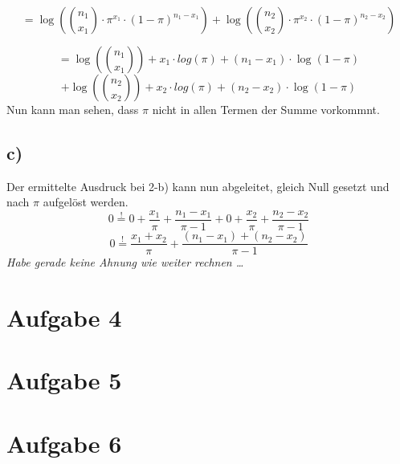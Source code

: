 \[ = \log\left({n_1 \choose x_1} \cdot \pi^{x_1} \cdot (1-\pi)^{n_1-x_1}\right)
   + \log\left({n_2 \choose x_2} \cdot \pi^{x_2} \cdot (1-\pi)^{n_2-x_2}\right)   \]

\[ = \log\left( {n_1 \choose x_1} \right) + x_1 \cdot log(\pi) +
     (n_1-x_1) \cdot \log(1-\pi) \]
\[ + \log\left( {n_2 \choose x_2} \right) + x_2 \cdot log(\pi) +
     (n_2-x_2) \cdot \log(1-\pi) \]
Nun kann man sehen, dass $\pi$ nicht in allen Termen der Summe vorkommnt.

\subsection*{c)}
Der ermittelte Ausdruck bei 2-b) kann nun abgeleitet, gleich Null gesetzt
und nach $\pi$ aufgelöst werden.
\[ 0 \stackrel{!}{=} 0 + \frac{x_1}{\pi} + \frac{n_1-x_1}{\pi-1}
   + 0 + \frac{x_2}{\pi} + \frac{n_2-x_2}{\pi-1} \]
\[ 0 \stackrel{!}{=} \frac{x_1+x_2}{\pi} + \frac{(n_1-x_1)+(n_2-x_2)}{\pi-1} \]
\emph{Habe gerade keine Ahnung wie weiter rechnen \ldots}

\section{Aufgabe 4}
\section{Aufgabe 5}
\section{Aufgabe 6}
